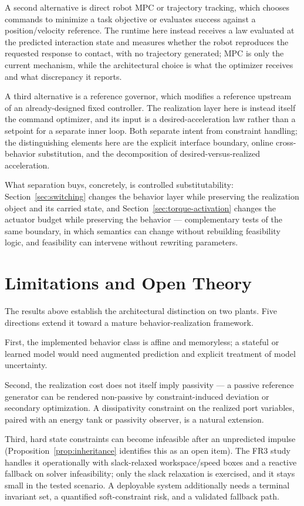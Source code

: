 \documentclass[journal]{IEEEtran}
\begin{document}
A second alternative is direct robot MPC or trajectory tracking, which
chooses commands to minimize a task objective or evaluates success
against a position/velocity reference. The runtime here instead receives
a law evaluated at the predicted interaction state and measures whether
the robot reproduces the requested response to contact, with no
trajectory generated; MPC is only the current mechanism, while the
architectural choice is what the optimizer receives and what discrepancy
it reports.

A third alternative is a reference governor, which modifies a reference
upstream of an already-designed fixed controller. The realization layer
here is instead itself the command optimizer, and its input is a
desired-acceleration law rather than a setpoint for a separate inner
loop. Both separate intent from constraint handling; the distinguishing
elements here are the explicit interface boundary, online cross-behavior
substitution, and the decomposition of desired-versus-realized
acceleration.

What separation buys, concretely, is controlled substitutability:
Section~\ref{sec:switching} changes the behavior layer while preserving
the realization object and its carried state, and
Section~\ref{sec:torque-activation} changes the actuator budget while
preserving the behavior --- complementary tests of the same boundary, in
which semantics can change without rebuilding feasibility logic, and
feasibility can intervene without rewriting parameters. 

\section{Limitations and Open Theory}
\label{sec:limitations}

The results above establish the architectural distinction on two plants.
Five directions extend it toward a mature behavior-realization framework.

First, the implemented behavior class is affine and memoryless; a
stateful or learned model would need augmented prediction and explicit
treatment of model uncertainty.

Second, the realization cost does not itself imply passivity --- a
passive reference generator can be rendered non-passive by
constraint-induced deviation or secondary optimization. A dissipativity
constraint on the realized port variables, paired with an energy tank or
passivity observer, is a natural extension.

Third, hard state constraints can become infeasible after an unpredicted
impulse (Proposition~\ref{prop:inheritance} identifies this as an open
item). The FR3 study handles it operationally with slack-relaxed
workspace/speed boxes and a reactive fallback on solver infeasibility;
only the slack relaxation is exercised, and it stays small in the tested
scenario. A deployable system additionally needs a terminal invariant
set, a quantified soft-constraint risk, and a validated fallback path.
\end{document}
